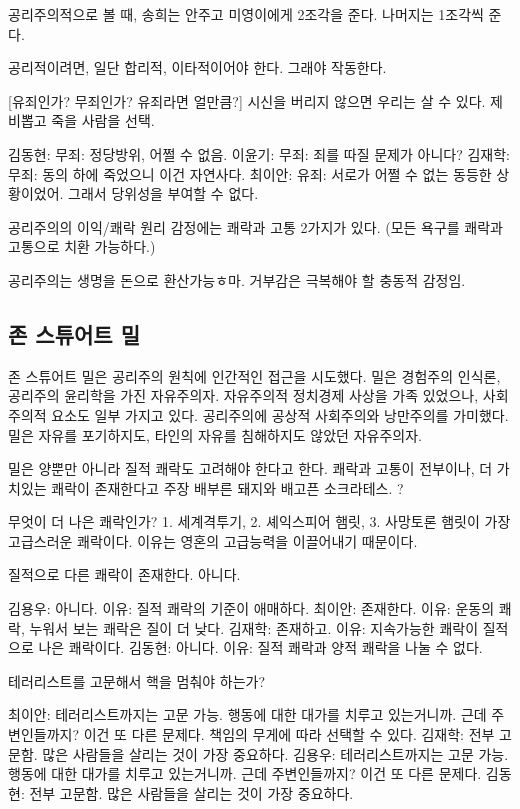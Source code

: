 공리주의적으로 볼 때, 송희는 안주고 미영이에게 2조각을 준다. 나머지는 1조각씩 준다.

공리적이려면, 일단 합리적, 이타적이어야 한다. 그래야 작동한다.

[유죄인가? 무죄인가? 유죄라면 얼만큼?]
시신을 버리지 않으면 우리는 살 수 있다.
제비뽑고 죽을 사람을 선택.

김동현: 무죄: 정당방위, 어쩔 수 없음.
이윤기: 무죄: 죄를 따질 문제가 아니다?
김재학: 무죄: 동의 하에 죽었으니 이건 자연사다.
최이안: 유죄: 서로가 어쩔 수 없는 동등한 상황이었어. 그래서 당위성을 부여할 수 없다.

공리주의의 이익/쾌락 원리
감정에는 쾌락과 고통 2가지가 있다. (모든 욕구를 쾌락과 고통으로 치환 가능하다.)

공리주의는 생명을 돈으로 환산가능ㅎ마. 거부감은 극복해야 할 충동적 감정임.

\subsection{존 스튜어트 밀}

존 스튜어트 밀은 공리주의 원칙에 인간적인 접근을 시도했다. 밀은 경험주의 인식론,
공리주의 윤리학을 가진 자유주의자. 자유주의적 정치경제 사상을 가족 있었으나,
사회주의적 요소도 일부 가지고 있다. 공리주의에 공상적 사회주의와 낭만주의를 가미했다.
밀은 자유를 포기하지도, 타인의 자유를 침해하지도 않았던 자유주의자.

밀은 양뿐만 아니라 질적 쾌락도 고려해야 한다고 한다. 쾌락과 고통이 전부이나, 더 가치있는 쾌락이 존재한다고 주장
배부른 돼지와 배고픈 소크라테스. ?

무엇이 더 나은 쾌락인가? 1. 세계격투기, 2. 셰익스피어 햄릿, 3. 사망토론
햄릿이 가장 고급스러운 쾌락이다. 이유는 영혼의 고급능력을 이끌어내기 때문이다.

질적으로 다른 쾌락이 존재한다. 아니다.

김용우: 아니다. 이유: 질적 쾌락의 기준이 애매하다.
최이안: 존재한다. 이유: 운동의 쾌락, 누워서 보는 쾌락은 질이 더 낮다.
김재학: 존재하고. 이유: 지속가능한 쾌락이 질적으로 나은 쾌락이다.
김동현: 아니다. 이유: 질적 쾌락과 양적 쾌락을 나눌 수 없다.

테러리스트를 고문해서 핵을 멈춰야 하는가?

최이안: 테러리스트까지는 고문 가능. 행동에 대한 대가를 치루고 있는거니까. 근데
주변인들까지? 이건 또 다른 문제다. 책임의 무게에 따라 선택할 수 있다.
김재학: 전부 고문함. 많은 사람들을 살리는 것이 가장 중요하다.
김용우: 테러리스트까지는 고문 가능. 행동에 대한 대가를 치루고 있는거니까. 근데
주변인들까지? 이건 또 다른 문제다.
김동현: 전부 고문함. 많은 사람들을 살리는 것이 가장 중요하다.


